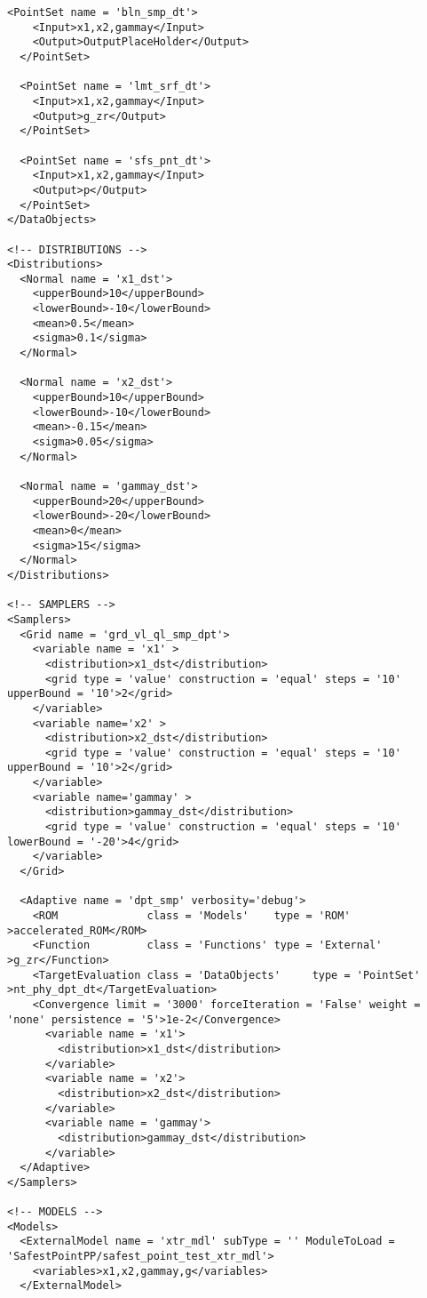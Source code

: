 \begin{lstlisting}[style=XML,morekeywords={debug,re,seeding,class,subType,limit}]
  <PointSet name = 'bln_smp_dt'>
    <Input>x1,x2,gammay</Input>
    <Output>OutputPlaceHolder</Output>
  </PointSet>

  <PointSet name = 'lmt_srf_dt'>
    <Input>x1,x2,gammay</Input>
    <Output>g_zr</Output>
  </PointSet>

  <PointSet name = 'sfs_pnt_dt'>
    <Input>x1,x2,gammay</Input>
    <Output>p</Output>
  </PointSet>
</DataObjects>

<!-- DISTRIBUTIONS -->
<Distributions>
  <Normal name = 'x1_dst'>
    <upperBound>10</upperBound>
    <lowerBound>-10</lowerBound>
  	<mean>0.5</mean>
    <sigma>0.1</sigma>
  </Normal>

  <Normal name = 'x2_dst'>
    <upperBound>10</upperBound>
    <lowerBound>-10</lowerBound>
    <mean>-0.15</mean>
    <sigma>0.05</sigma>
  </Normal>

  <Normal name = 'gammay_dst'>
    <upperBound>20</upperBound>
    <lowerBound>-20</lowerBound>
    <mean>0</mean>
    <sigma>15</sigma>
  </Normal>
</Distributions>

<!-- SAMPLERS -->
<Samplers>
  <Grid name = 'grd_vl_ql_smp_dpt'>
    <variable name = 'x1' >
      <distribution>x1_dst</distribution>
      <grid type = 'value' construction = 'equal' steps = '10' upperBound = '10'>2</grid>
    </variable>
    <variable name='x2' >
      <distribution>x2_dst</distribution>
      <grid type = 'value' construction = 'equal' steps = '10' upperBound = '10'>2</grid>
    </variable>
    <variable name='gammay' >
      <distribution>gammay_dst</distribution>
      <grid type = 'value' construction = 'equal' steps = '10' lowerBound = '-20'>4</grid>
    </variable>
  </Grid>

  <Adaptive name = 'dpt_smp' verbosity='debug'>
    <ROM              class = 'Models'    type = 'ROM'           >accelerated_ROM</ROM>
    <Function         class = 'Functions' type = 'External'      >g_zr</Function>
    <TargetEvaluation class = 'DataObjects'     type = 'PointSet'  >nt_phy_dpt_dt</TargetEvaluation>
    <Convergence limit = '3000' forceIteration = 'False' weight = 'none' persistence = '5'>1e-2</Convergence>
      <variable name = 'x1'>
        <distribution>x1_dst</distribution>
      </variable>
      <variable name = 'x2'>
        <distribution>x2_dst</distribution>
      </variable>
      <variable name = 'gammay'>
        <distribution>gammay_dst</distribution>
      </variable>
  </Adaptive>
</Samplers>

<!-- MODELS -->
<Models>
  <ExternalModel name = 'xtr_mdl' subType = '' ModuleToLoad = 'SafestPointPP/safest_point_test_xtr_mdl'>
    <variables>x1,x2,gammay,g</variables>
  </ExternalModel>


\end{lstlisting}
